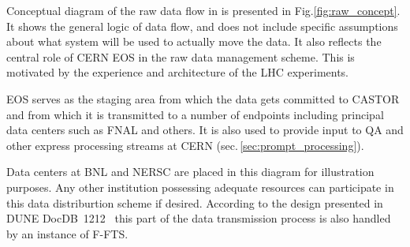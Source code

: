 \noindent
Conceptual diagram of the raw data flow in \pd is presented in Fig.\ref{fig:raw_concept}. It shows the general logic
of data flow, and does not include specific assumptions about what system will be used to actually move the data.
It also reflects the central role of CERN EOS in the \pd raw data management scheme. This is motivated by the experience
and architecture of the LHC experiments.

EOS serves as the staging area from which the data gets committed to CASTOR
and from which it is transmitted to a number of endpoints including principal data centers such as FNAL and others.
It is also used to provide input to QA and other express processing streams at CERN (sec.\,\ref{sec:prompt_processing}).

Data centers at BNL and NERSC are placed in this diagram for illustration purposes. Any other institution possessing adequate
resources can participate in this data distriburtion scheme if desired. According to the design presented in DUNE DocDB~1212~\cite{docdb1212}
this part of the data transmission process is also handled by an instance of F-FTS.


